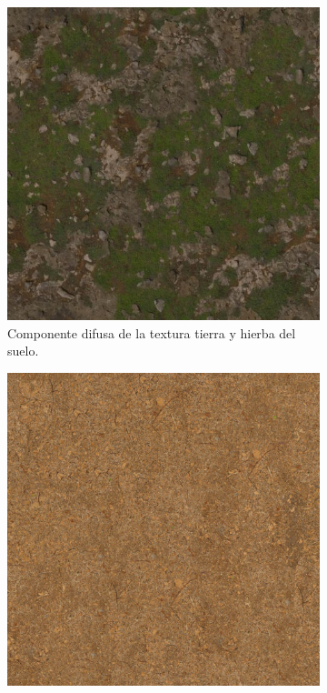 \begin{figure}[H]
    \centering 
	\begin{subfigure}[t]{0.48\textwidth}
	    \centering
        \includegraphics[width=\textwidth]{imagenes/converted/coast_sand_rocks_02_diff_4k.jpg}
        \caption{Componente difusa de la textura tierra y hierba del suelo.}
        \label{fig:coastsand}
    \end{subfigure}
    \hfill 
	\begin{subfigure}[t]{0.48\textwidth}
	    \centering
        \includegraphics[width=\textwidth]{imagenes/converted/Ground066_2K_Color.jpg}

\end{subfigure}
\end{figure}
